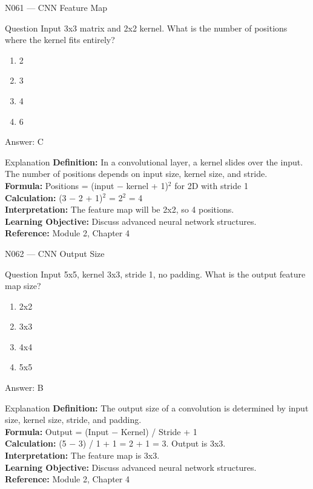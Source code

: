 \documentclass[aspectratio=169,8pt]{beamer}
\begin{document}
	\begin{frame}{N061 --- CNN Feature Map}
		\begin{block}{Question}
			Input 3x3 matrix and 2x2 kernel. What is the number of positions where the kernel fits entirely?
			\begin{enumerate}
				\item 2
				\item 3
				\item 4
				\item 6
			\end{enumerate}
		\end{block}
		\begin{exampleblock}{Answer: C}\end{exampleblock}
		\begin{block}{Explanation}
			\textbf{Definition:} In a convolutional layer, a kernel slides over the input. The number of positions depends on input size, kernel size, and stride.\\
			\textbf{Formula:} Positions = (input $-$ kernel + 1)$^{2}$ for 2D with stride 1\\
			\textbf{Calculation:} (3 $-$ 2 + 1)$^{2}$ = 2$^{2}$ = 4\\
			\textbf{Interpretation:} The feature map will be 2x2, so 4 positions.\\
			\textbf{Learning Objective:} Discuss advanced neural network structures.\\
			\textbf{Reference:} Module 2, Chapter 4
		\end{block}
	\end{frame}
	
	\begin{frame}{N062 --- CNN Output Size}
		\begin{block}{Question}
			Input 5x5, kernel 3x3, stride 1, no padding. What is the output feature map size?
			\begin{enumerate}
				\item 2x2
				\item 3x3
				\item 4x4
				\item 5x5
			\end{enumerate}
		\end{block}
		\begin{exampleblock}{Answer: B}\end{exampleblock}
		\begin{block}{Explanation}
			\textbf{Definition:} The output size of a convolution is determined by input size, kernel size, stride, and padding.\\
			\textbf{Formula:} Output = (Input $-$ Kernel) / Stride + 1\\
			\textbf{Calculation:} (5 $-$ 3) / 1 + 1 = 2 + 1 = 3. Output is 3x3.\\
			\textbf{Interpretation:} The feature map is 3x3.\\
			\textbf{Learning Objective:} Discuss advanced neural network structures.\\
			\textbf{Reference:} Module 2, Chapter 4
		\end{block}
	\end{frame}
	
\end{document}
